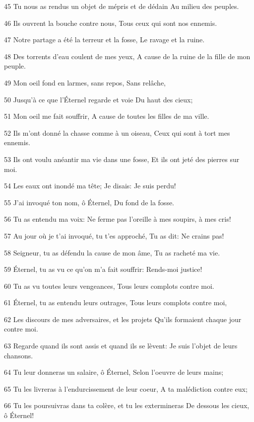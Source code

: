 \par 45 Tu nous as rendus un objet de mépris et de dédain Au milieu des peuples.
\par 46 Ils ouvrent la bouche contre nous, Tous ceux qui sont nos ennemis.
\par 47 Notre partage a été la terreur et la fosse, Le ravage et la ruine.
\par 48 Des torrents d'eau coulent de mes yeux, A cause de la ruine de la fille de mon peuple.
\par 49 Mon oeil fond en larmes, sans repos, Sans relâche,
\par 50 Jusqu'à ce que l'Éternel regarde et voie Du haut des cieux;
\par 51 Mon oeil me fait souffrir, A cause de toutes les filles de ma ville.
\par 52 Ils m'ont donné la chasse comme à un oiseau, Ceux qui sont à tort mes ennemis.
\par 53 Ils ont voulu anéantir ma vie dans une fosse, Et ils ont jeté des pierres sur moi.
\par 54 Les eaux ont inondé ma tête; Je disais: Je suis perdu!
\par 55 J'ai invoqué ton nom, ô Éternel, Du fond de la fosse.
\par 56 Tu as entendu ma voix: Ne ferme pas l'oreille à mes soupirs, à mes cris!
\par 57 Au jour où je t'ai invoqué, tu t'es approché, Tu as dit: Ne crains pas!
\par 58 Seigneur, tu as défendu la cause de mon âme, Tu as racheté ma vie.
\par 59 Éternel, tu as vu ce qu'on m'a fait souffrir: Rends-moi justice!
\par 60 Tu as vu toutes leurs vengeances, Tous leurs complots contre moi.
\par 61 Éternel, tu as entendu leurs outrages, Tous leurs complots contre moi,
\par 62 Les discours de mes adversaires, et les projets Qu'ils formaient chaque jour contre moi.
\par 63 Regarde quand ils sont assis et quand ils se lèvent: Je suis l'objet de leurs chansons.
\par 64 Tu leur donneras un salaire, ô Éternel, Selon l'oeuvre de leurs mains;
\par 65 Tu les livreras à l'endurcissement de leur coeur, A ta malédiction contre eux;
\par 66 Tu les poursuivras dans ta colère, et tu les extermineras De dessous les cieux, ô Éternel!

